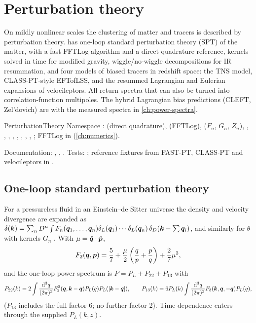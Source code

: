 \chapter{Perturbation theory}\label{ch:perturbation-theory}

On mildly nonlinear scales the clustering of matter and tracers is described by perturbation theory. \fml{} has
one-loop standard perturbation theory (SPT) of the matter, with a fast FFTLog algorithm and a direct quadrature
reference, kernels solved in time for modified gravity, wiggle/no-wiggle decompositions for IR resummation, and four
models of biased tracers in redshift space: the TNS model, CLASS-PT-style EFTofLSS, and the resummed Lagrangian and
Eulerian expansions of velocileptors. All return spectra that can also be turned into correlation-function
multipoles. The hybrid Lagrangian bias predictions (CLEFT, Zel'dovich) are with the measured spectra in
\cref{ch:power-spectra}.

\begin{modulebox}{PerturbationTheory}
Namespace :  (direct quadrature),  (FFTLog),
 ($F_n$, $G_n$, $Z_n$), , , , ,
, , , ,
; FFTLog in  (\cref{ch:numerics}).\par
Documentation: , , .
Tests: ; reference fixtures from FAST-PT, CLASS-PT and velocileptors in .
\end{modulebox}

\section{One-loop standard perturbation theory}\label{sec:pt-spt}

For a pressureless fluid in an Einstein--de Sitter universe the density and velocity divergence are expanded as
$\delta(\bm{k})=\sum_n D^n\int F_n(\bm{q}_1,\ldots,\bm{q}_n)\delta_L(\bm{q}_1)\cdots\delta_L(\bm{q}_n)\,\delta_D(\bm{k}-\textstyle\sum\bm{q}_i)$,
and similarly for $\theta$ with kernels $G_n$ \cite{Bernardeau2002}. With $\mu=\hat{\bm{q}}\cdot\hat{\bm p}$,
\begin{equation}
F_2(\bm{q},\bm p)=\frac57+\frac\mu2\left(\frac qp+\frac pq\right)+\frac27\mu^2,
\end{equation}
and the one-loop power spectrum is $P=P_L+P_{22}+P_{13}$ with
\begin{equation}
P_{22}(k)=2\int\frac{\mathrm{d}^3q}{(2\pi)^3}F_2^2(\bm{q},\bm{k}-\bm{q})P_L(q)P_L(|\bm{k}-\bm{q}|),\qquad
P_{13}(k)=6P_L(k)\int\frac{\mathrm{d}^3q}{(2\pi)^3}F_3(\bm{k},\bm{q},-\bm{q})P_L(q),
\end{equation}
($P_{13}$ includes the full factor 6; no further factor 2). Time dependence enters through the supplied $P_L(k,z)$.

